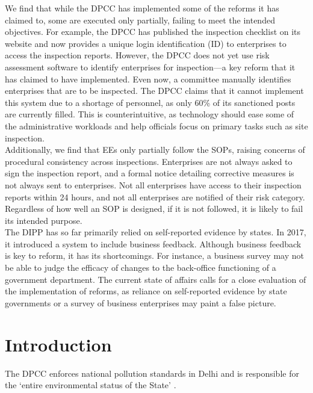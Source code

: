 \documentclass[a4paper, 12pt]{article}
\begin{document}
                 We find that while the DPCC has implemented some of the reforms it has claimed to, some are executed only partially, failing to meet the intended objectives. For example, the DPCC has published the inspection checklist on its website and now provides a unique login identification (ID) to enterprises to access the inspection reports. However, the DPCC does not yet use risk assessment software to identify enterprises for inspection—a key reform that it has claimed to have implemented. Even now, a committee manually identifies enterprises that are to be inspected. The DPCC claims that it cannot implement this system due to a shortage of personnel, as only 60\% of its sanctioned posts are currently filled. This is counterintuitive, as technology should ease some of the administrative workloads and help officials focus on primary tasks such as site inspection. \\
                 
                 Additionally, we find that EEs only partially follow the SOPs, raising concerns of procedural consistency across inspections. Enterprises are not always asked to sign the inspection report, and a formal notice detailing corrective measures is not always sent to enterprises. Not all enterprises have access to their inspection reports within 24 hours, and not all enterprises are notified of their risk category. Regardless of how well an SOP is designed, if it is not followed, it is likely to fail its intended purpose. \\
                 
                  The DIPP has so far primarily relied on self-reported evidence by states. In 2017, it introduced a system to include business feedback. Although business feedback is key to reform, it has its shortcomings. For instance, a business survey may not be able to judge the efficacy of changes to the back-office functioning of a government department. The current state of affairs calls for a close evaluation of the implementation of reforms, as reliance on self-reported evidence by state governments or a survey of business enterprises may paint a false picture. 
                  
                    \newpage
                    \section{Introduction}
                    
                 The DPCC enforces national pollution standards in Delhi and is responsible for the ‘entire environmental status of the State’ \parencite{NGT}. \\
                 
\end{document}
